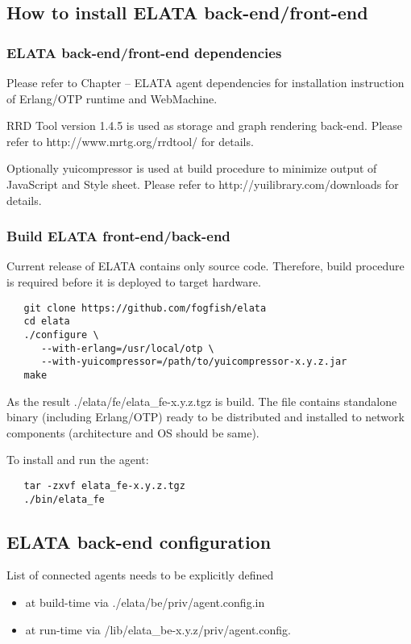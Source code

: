 \subsection{How to install ELATA back-end/front-end}


\subsubsection{ELATA back-end/front-end dependencies}

Please refer to Chapter -- ELATA agent dependencies for installation instruction of Erlang/OTP runtime and WebMachine.


RRD Tool version 1.4.5 is used as storage and graph rendering back-end. Please refer to http://www.mrtg.org/rrdtool/ for details. 


Optionally yuicompressor is used at build procedure to minimize output of JavaScript and Style sheet. Please refer to http://yuilibrary.com/downloads for details.


\subsubsection{Build ELATA front-end/back-end}

Current release of ELATA contains only source code. Therefore, build procedure is required before it is deployed to target hardware.    

\begin{verbatim}
   git clone https://github.com/fogfish/elata
   cd elata
   ./configure \
      --with-erlang=/usr/local/otp \
      --with-yuicompressor=/path/to/yuicompressor-x.y.z.jar
   make
\end{verbatim}  

As the result ./elata/fe/elata\_fe-x.y.z.tgz is build. The file contains standalone binary (including Erlang/OTP) ready to be distributed and installed to network components (architecture and OS should be same).


To install and run the agent:
\begin{verbatim}
   tar -zxvf elata_fe-x.y.z.tgz
   ./bin/elata_fe
\end{verbatim}


\subsection{ELATA back-end configuration}

List of connected agents needs to be explicitly defined
\begin{itemize}
\item at build-time via ./elata/be/priv/agent.config.in
\item at run-time via  /lib/elata\_be-x.y.z/priv/agent.config.
\end{itemize}

